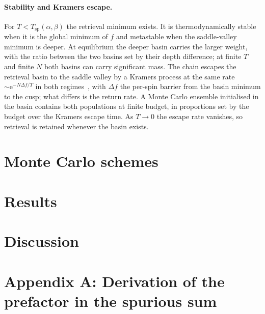 \documentclass[letterpaper]{article} %
\newcommand{\e}{{\mathrm{e}}}
\newcommand{\Bnet}{\beta}
\begin{document}
\paragraph{Stability and Kramers escape.}
For $T < T_{\mathrm{sp}}(\alpha, \Bnet)$ the retrieval minimum exists. It is
thermodynamically stable when it is the global minimum of $f$ and metastable when
the saddle-valley minimum is deeper. At equilibrium the deeper basin carries the
larger weight, with the ratio between the two basins set by their depth
difference; at finite $T$ and finite $N$ both basins can carry significant mass.
The chain escapes the retrieval basin to the saddle valley by a Kramers process
at the same rate $\sim \e^{-N \Delta f / T}$ in both
regimes~\citep{kramers1940, hanggi1990}, with $\Delta f$ the per-spin barrier from
the basin minimum to the cusp; what differs is the return rate. A Monte Carlo
ensemble initialised in the basin contains both populations at finite budget, in
proportions set by the budget over the Kramers escape time. As $T \to 0$ the
escape rate vanishes, so retrieval is retained whenever the basin exists.

\section{Monte Carlo schemes}


\section{Results}


\section{Discussion}









\appendix

\section{Appendix A: Derivation of the prefactor in the spurious sum}
\end{document}
